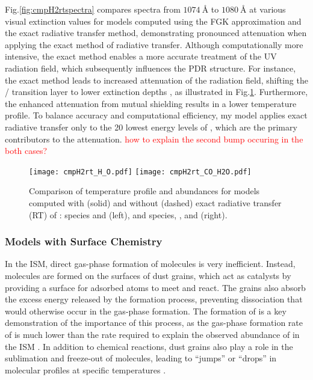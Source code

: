 \documentclass[12pt,a4paper]{article}
\newcommand{\qt}[1]{\textcolor{red}{#1}}
\begin{document}
Fig.\ref{fig:cmpH2rtspectra} compares spectra from $1074~\text{\AA}$ to $1080~\text{\AA}$ at various visual extinction values for models computed using the FGK approximation and the exact radiative transfer method, demonstrating pronounced attenuation when applying the exact method of  radiative transfer. Although computationally more intensive, the exact method enables a more accurate treatment of the UV radiation field, which subsequently influences the PDR structure. For instance, the exact method leads to increased attenuation of the radiation field, shifting the / transition layer to lower extinction depths \parencite{Goicoechea2007}, as illustrated in Fig.\ref{fig:cmpH2rt}. Furthermore, the enhanced attenuation from mutual shielding results in a lower temperature profile. To balance accuracy and computational efficiency, my model applies exact radiative transfer only to the 20 lowest energy levels of , which are the primary contributors to the attenuation. \qt{how to explain the second bump occuring in the both cases?}

\begin{figure}[hb]
    \centering
    \texttt{[image: cmpH2rt\_H\_O.pdf]}
    \texttt{[image: cmpH2rt\_CO\_H2O.pdf]}
    \caption{Comparison of temperature profile and abundances for models computed with (solid) and without (dashed) exact radiative transfer (RT) of :  species and  (left), and  species, , and  (right). } \label{fig:cmpH2rt}
\end{figure}

\subsubsection{Models with Surface Chemistry}
In the ISM, direct gas-phase formation of molecules is very inefficient. Instead, molecules are formed on the surfaces of dust grains, which act as catalysts by providing a surface for adsorbed atoms to meet and react. The grains also absorb the excess energy released by the formation process, preventing dissociation that would otherwise occur in the gas-phase formation. The formation of  is a key demonstration of the importance of this process, as the gas-phase formation rate of  is much lower than the rate required to explain the observed abundance of  in the ISM \parencite{Gould1963,Hollenbach1971}. In addition to chemical reactions, dust grains also play a role in the sublimation and freeze-out of molecules, leading to “jumps” or “drops” in molecular profiles at specific temperatures \parencite{Herbst2009}.
\end{document}
